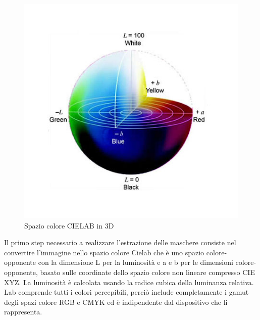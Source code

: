 \documentclass[a4paper,12pt]{report}
\begin{document}
\begin{figure}[H]
\begin{minipage}{0.35\textwidth}
          \includegraphics[width=\textwidth]{assets/images/methods/porting/cielab/cielab1.jpg}   
          \caption{Spazio colore CIELAB in 3D}
        \end{minipage}
      \end{figure}


      Il primo step necessario a realizzare l'estrazione delle maschere consiste nel convertire l'immagine nello spazio colore Cielab che è uno spazio colore-opponente con la dimensione L per la luminosità e a e b per le dimensioni colore-opponente,
      basato sulle coordinate dello spazio colore non lineare compresso CIE XYZ.
      La luminosità è calcolata usando la radice cubica della luminanza relativa. 
      Lab comprende tutti i colori percepibili, perciò include completamente i gamut degli 
      spazi colore RGB e CMYK ed è indipendente dal dispositivo che li rappresenta.
      
\end{document}
